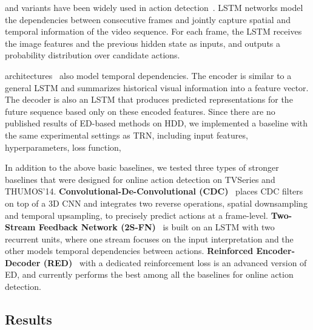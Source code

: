  and variants have been widely
used in action detection~\cite{RamanishkaCVPR2018,yeung2018every}.
LSTM networks model the dependencies between consecutive 
frames and jointly
capture spatial and temporal information of the video sequence. For
each frame, the LSTM receives the image features and the previous
hidden state as inputs, and outputs a probability distribution over
candidate actions.

 architectures~\cite{cho2014learning}
also model temporal dependencies.
The encoder is similar to a general LSTM and summarizes  historical visual information into a feature vector.
The decoder is also an LSTM that produces
predicted representations for the future sequence based only on these
encoded features. Since there are no published results of ED-based
methods on HDD, we implemented a baseline with the same experimental
settings as TRN, including input features, hyperparameters,
loss function, \etc

In addition to the above basic baselines, we tested three
types of stronger baselines that were designed for online action 
detection on TVSeries and THUMOS'14.
\textbf{Convolutional-De-Convolutional (CDC)}~\cite{shou2017cdc}
places CDC filters on top of a 3D CNN and integrates two reverse
operations, spatial downsampling and temporal upsampling, to
precisely predict actions at a frame-level.
\textbf{Two-Stream Feedback Network (2S-FN)}~\cite{de2018modeling}
is built on an LSTM with two recurrent units, where one stream focuses
on the input interpretation and the other models temporal dependencies
between actions.
\textbf{Reinforced Encoder-Decoder (RED)}~\cite{gao2017red} with
a dedicated reinforcement loss is an advanced version of ED,
and currently performs the best among all the baselines for online
action detection.

\subsection{Results}

